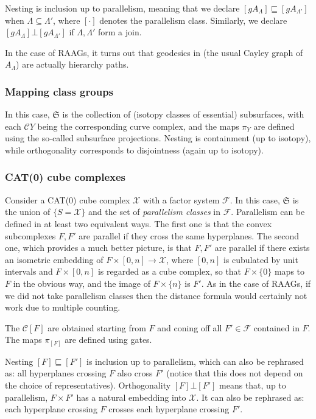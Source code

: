 \documentclass[11pt,oneside]{amsart}
\theoremstyle{definition}
\newcommand{\cuco}[1]{{\mathcal #1}}
\newcommand{\fontact}{{\mathcal C}}
\newcommand{\nest}{\sqsubseteq}
\newcommand{\orth}{\bot}
\begin{document}
Nesting is inclusion up to parallelism, meaning that we declare $[gA_\Lambda]\nest [gA_{\Lambda'}]$ when $\Lambda\subseteq \Lambda'$, where $[\cdot]$ denotes the parallelism class. Similarly, we declare $[gA_\Lambda]\orth [gA_{\Lambda'}]$ if $\Lambda,\Lambda'$ form a join.

In the case of RAAGs, it turns out that geodesics in (the usual Cayley graph of $A_\Lambda$) are actually hierarchy paths.


\subsubsection{Mapping class groups} In this case, $\mathfrak S$ is the collection of (isotopy classes of essential) subsurfaces, with each $\fontact Y$ being the corresponding curve complex, and the maps $\pi_Y$ are defined using the so-called subsurface projections.
 Nesting is containment (up to isotopy), while orthogonality corresponds to disjointness (again up to isotopy).
 
 \subsubsection{CAT(0) cube complexes} Consider a CAT(0) cube complex $\cuco X$ with a factor system $\mathcal F$. In this case, $\mathfrak S$ is the union of $\{S=\cuco X\}$ and the set of \emph{parallelism classes} in $\mathcal F$. Parallelism can be defined in at least two equivalent ways. The first one is that the convex subcomplexes $F,F'$ are parallel if they cross the same hyperplanes. The second one, which provides a much better picture, is that $F,F'$ are parallel if there exists an isometric embedding of $F\times [0,n]\to \cuco X$, where $[0,n]$ is cubulated by unit intervals and $F\times [0,n]$ is regarded as a cube complex, so that $F\times\{0\}$ maps to $F$ in the obvious way, and the image of $F\times \{n\}$ is $F'$. As in the case of RAAGs, if we did not take parallelism classes then the distance formula would certainly not work due to multiple counting.
 
 The $\fontact [F]$ are obtained starting from $F$ and coning off all $F'\in\mathcal F$ contained in $F$. The maps $\pi_{[F]}$ are defined using gates.
 
 Nesting $[F]\nest [F']$ is inclusion up to parallelism, which can also be rephrased as: all hyperplanes crossing $F$ also cross $F'$ (notice that this does not depend on the choice of representatives). Orthogonality $[F]\orth [F']$ means that, up to parallelism, $F\times F'$ has a natural embedding into $\cuco X$. It can also be rephrased as: each hyperplane crossing $F$ crosses each hyperplane crossing $F'$.
\end{document}

